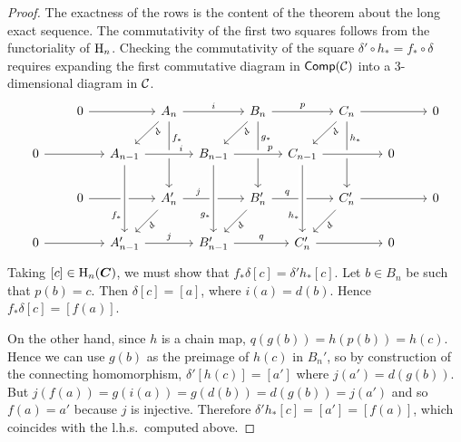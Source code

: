 \begin{proof}
     The exactness of the rows is the content of the theorem about the long exact sequence. The commutativity of the first two squares follows from the functoriality of $\mathrm{H}_n$. Checking the commutativity of the square $\delta'\circ h_\ast=f_\ast\circ \delta$ requires expanding the first commutative diagram in $\mathsf{Comp}(\mathcal{C})$ into a 3-dimensional diagram in $\mathcal{C}$.
     \[
     \begin{tikzcd}[column sep={35,between origins}]
        &
        0 
        \ar{rr}
        & &
        A_n
        \ar{dl}[swap, sloped, near start]{d}
        \ar{rr}{i}
        \ar[]{dd}[near start]{f_\ast}
        & & B_n
        \ar{dd}[near start]{g_\ast}
        \ar{rr}{p}
        \ar{dl}[swap, sloped, near start]{d}
        & & C_n
        \ar{dd}[near start]{h_\ast}
        \ar{dl}[swap, sloped, near start]{d}
        \ar{rr}
        & &
        0
        \\
        0
        \ar{rr}
        & &
        A_{n-1}
        \ar[crossing over]{rr}[near end]{i}
        & & B_{n-1}
        \ar[crossing over]{rr}[near end]{p}
        & & C_{n-1}
        \ar[crossing over]{rr}
        & &
        0
        \\
        &
        0
        \ar{rr}
        & &
        A_n'
        \ar[near start]{rr}{j}
        \ar[sloped, swap]{dl}{d}
        & & B_n'
        \ar[near start]{rr}{q}
        \ar[sloped, swap]{dl}{d}
        & & C_n'
        \ar[sloped, swap]{dl}{d}
        \ar{rr}
        & &
        0
        \\
        0
        \ar{rr}
        & &
        A_{n-1}'
        \ar{rr}{j}
        \ar[crossing over, leftarrow, near start]{uu}{f_\ast}
        & & B_{n-1}'
        \ar{rr}{q}
        \ar[crossing over, leftarrow, near start]{uu}{g_\ast}
        & & C_n'
        \ar[crossing over, leftarrow, near start]{uu}{h_\ast}
        \ar{rr}
        & &
        0
        \end{tikzcd}
     \]
     Taking $[c]\in \mathrm{H}_n(\boldsymbol{C})$, we must show that $f_\ast\delta [c]=\delta ' h_\ast [c]$. Let $b\in B_n$ be such that $p(b)=c$. Then $\delta [c]=[a]$, where $i(a)=d(b)$. Hence $f_\ast \delta [c]=[f(a)]$. 
     
     On the other hand, since $h$ is a chain map, $q(g(b))=h(p(b))=h(c)$. Hence we can use $g(b)$ as the preimage of $h(c)$ in $B_n'$, so by construction of the connecting homomorphism, $\delta '[h(c)]=[a']$ where $j(a')=d(g(b))$. But $j(f(a))=g(i(a))=g(d(b))=d(g(b))=j(a')$ and so $f(a)=a'$ because $j$ is injective. Therefore $\delta'h_\ast [c]=[a']=[f(a)]$, which coincides with the l.h.s.\ computed above.
\end{proof}

